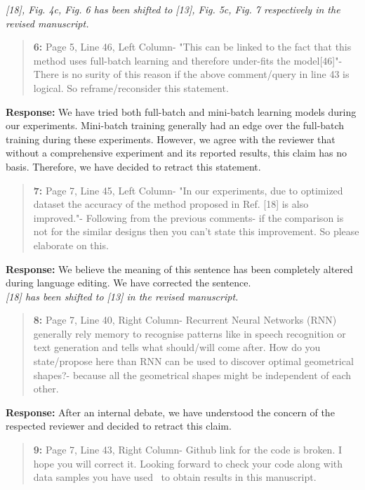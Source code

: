 \documentclass{article}
\begin{document}
	\textit{[18], Fig. 4c, Fig. 6 has been shifted to [13], Fig. 5c, Fig. 7 respectively in the revised manuscript.}
	
	\begin{quote}
		\textbf{6: }Page 5, Line 46, Left Column- "This can be linked to the fact that this method uses full-batch learning and therefore under-fits the model[46]"- There is no surity of this reason if the above comment/query in line 43 is logical. So reframe/reconsider this statement.
	\end{quote}
	
	\textbf{Response: }We have tried both full-batch and mini-batch learning models during our experiments. Mini-batch training generally had an edge over the full-batch training during these experiments. However, we agree with the reviewer that without a comprehensive experiment and its reported results, this claim has no basis. Therefore, we have decided to retract this statement.
	
	\begin{quote}
		\textbf{7: }Page 7, Line 45, Left Column- "In our experiments, due to optimized dataset the accuracy of the method proposed in Ref. [18] is also improved."- Following from the previous comments- if the comparison is not for the similar designs then you can't state this improvement. So please elaborate on this.
	\end{quote}
	
	\textbf{Response: }We believe the meaning of this sentence has been completely altered during language editing. We have corrected the sentence. \\
	\textit{[18] has been shifted to [13] in the revised manuscript.}
	
	\begin{quote}
		\textbf{8: }Page 7, Line 40, Right Column- Recurrent Neural Networks (RNN) generally rely memory to recognise patterns like in speech recognition or text generation and tells what should/will come after. How do you state/propose here than RNN can be used to discover optimal geometrical shapes?- because all the geometrical shapes might be independent of each other.
	\end{quote}
	
	\textbf{Response: }After an internal debate, we have understood the concern of the respected reviewer and decided to retract this claim.
	
	\begin{quote}
		\textbf{9: }Page 7, Line 43, Right Column- Github link for the code is broken. I hope you will correct it. Looking forward to check your code along with data samples you have used  to obtain results in this manuscript.
	\end{quote}
	
\end{document}
